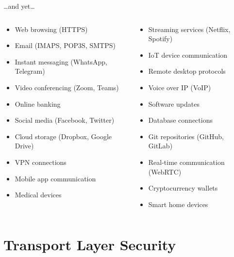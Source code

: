 \documentclass[aspectratio=169, lualatex, handout]{beamer}
\begin{document}
\begin{frame}{\ldots and yet\ldots}
	\begin{columns}[c]
		\begin{column}{0.5\textwidth}
			\begin{itemize}[<+->]
				\item Web browsing (HTTPS)
				\item Email (IMAPS, POP3S, SMTPS)
				\item Instant messaging (WhatsApp, Telegram)
				\item Video conferencing (Zoom, Teams)
				\item Online banking
				\item Social media (Facebook, Twitter)
				\item Cloud storage (Dropbox, Google Drive)
				\item VPN connections
				\item Mobile app communication
				\item Medical devices
			\end{itemize}
		\end{column}
		\begin{column}{0.5\textwidth}
			\begin{itemize}[<+->]
				\item Streaming services (Netflix, Spotify)
				\item IoT device communication
				\item Remote desktop protocols
				\item Voice over IP (VoIP)
				\item Software updates
				\item Database connections
				\item Git repositories (GitHub, GitLab)
				\item Real-time communication (WebRTC)
				\item Cryptocurrency wallets
				\item Smart home devices
			\end{itemize}
		\end{column}
	\end{columns}
\end{frame}

\section{Transport Layer Security}
\end{document}
